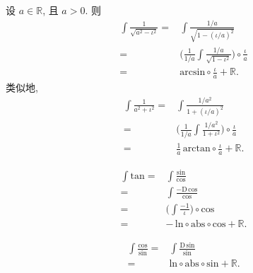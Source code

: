 \begin{example}
    设 $a \in \mathbb{R}$, 且 $a > 0$. 则
    \begin{align*}
        \int {\frac{1}{\sqrt{a^2 - \iota^2}}}
        = {} & \int {\frac{1/a}{\sqrt{1 - (\iota/a)^2}}}                                               \\
        = {} & \Bigg( \frac{1}{1/a} \int {\frac{1/a}{\sqrt{1 - \iota^2}}} \Bigg) \circ \frac{\iota}{a} \\
        = {} & \mathrm{arcsin} \circ \frac{\iota}{a} + \mathbb{R}.
    \end{align*}
    类似地,
    \begin{align*}
        \int {\frac{1}{a^2 + \iota^2}}
        = {} & \int {\frac{1/a^2}{1 + (\iota/a)^2}}                                               \\
        = {} & \Bigg( \frac{1}{1/a} \int {\frac{1/a^2}{1 + \iota^2}} \Bigg) \circ \frac{\iota}{a} \\
        = {} & \frac{1}{a}\,\mathrm{arctan} \circ \frac{\iota}{a} + \mathbb{R}.
    \end{align*}
\end{example}

\begin{example}
    \begin{align*}
        \int {\mathrm{tan}}
        = {} & \int {\frac{\mathrm{sin}}{\mathrm{cos}}}                             \\
        = {} & \int {\frac{-\mathrm{D}\,\mathrm{cos}}{\mathrm{cos}}}                \\
        = {} & \Bigg( \int {\frac{-1}{\iota}} \Bigg) \circ \mathrm{cos}             \\
        = {} & {-\,\mathrm{ln}} \circ \mathrm{abs} \circ \mathrm{cos} + \mathbb{R}.
    \end{align*}
\end{example}

\begin{example}
    \begin{align*}
        \int {\frac{\mathrm{cos}}{\mathrm{sin}}}
        = {} & \int {\frac{\mathrm{D}\,\mathrm{sin}}{\mathrm{sin}}}            \\
        = {} & \mathrm{ln} \circ \mathrm{abs} \circ \mathrm{sin} + \mathbb{R}.
    \end{align*}
\end{example}

